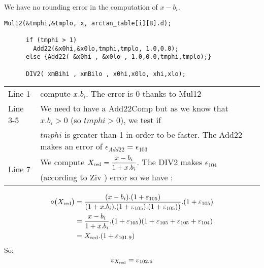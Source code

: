 We have no rounding error in the computation of $x-b_i$.

\begin{lstlisting}[caption={Reduction part 2},firstnumber=1]
      Mul12(&tmphi,&tmplo, x, arctan_table[i][B].d);

      if (tmphi > 1)
        Add22(&x0hi,&x0lo,tmphi,tmplo, 1.0,0.0);
      else {Add22( &x0hi , &x0lo , 1.0,0.0,tmphi,tmplo);}
      
      DIV2( xmBihi , xmBilo , x0hi,x0lo, xhi,xlo);

\end{lstlisting}

\begin{tabular}{ll}
Line 1 & compute $x.b_i$. The error is 0 thanks to Mul12\\
Line 3-5 & We need to have a Add22Comp but as we know that $x.b_i > 0$ (so
$tmphi>0$), we test if\\& $tmphi$ is greater than 1 in order to be
faster. The Add22 makes an error of $\epsilon_{Add22}=\epsilon_{103}$\\
Line 7 & We compute $X_{\mathrm{red}} = \dfrac{x-b_i}{1+x.b_i}$. The DIV2 makes $\epsilon_{104}$ (according to Ziv \cite{Ziv91}) error so we have :
\end{tabular}
\bigskip

\begin{equation}
\begin{split}
   \circ\big(X_{\mathrm{red}}\big) & = \frac{(x-b_i).(1+\varepsilon_{105})}{(1+x.b_i).(1+\varepsilon_{105})
          .(1+\varepsilon_{105}) )}.(1+\varepsilon_{105}) \\
         & =
          \frac{x-b_i}{1+x.b_i}.(1+\varepsilon_{105})(1+\varepsilon_{105}+\varepsilon_{105}+\varepsilon_{104})\\
         & = X_{\mathrm{red}} . (1+\varepsilon_{101.9})\nonumber
\end{split}
\end{equation}
So: 
\begin{equation}
\varepsilon_{X_{\mathrm{red}}} = \varepsilon_{102.6} \label{eps:equation}
\end{equation}
